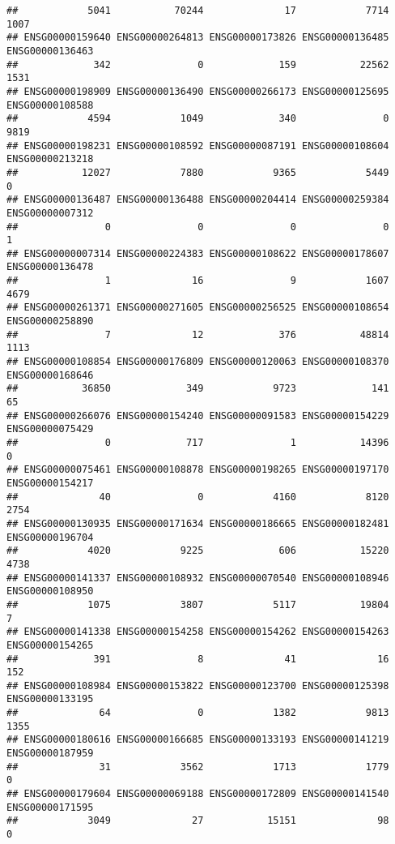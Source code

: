 \documentclass[
]{article}
\begin{document}
\begin{verbatim}
##            5041           70244              17            7714            1007 
## ENSG00000159640 ENSG00000264813 ENSG00000173826 ENSG00000136485 ENSG00000136463 
##             342               0             159           22562            1531 
## ENSG00000198909 ENSG00000136490 ENSG00000266173 ENSG00000125695 ENSG00000108588 
##            4594            1049             340               0            9819 
## ENSG00000198231 ENSG00000108592 ENSG00000087191 ENSG00000108604 ENSG00000213218 
##           12027            7880            9365            5449               0 
## ENSG00000136487 ENSG00000136488 ENSG00000204414 ENSG00000259384 ENSG00000007312 
##               0               0               0               0               1 
## ENSG00000007314 ENSG00000224383 ENSG00000108622 ENSG00000178607 ENSG00000136478 
##               1              16               9            1607            4679 
## ENSG00000261371 ENSG00000271605 ENSG00000256525 ENSG00000108654 ENSG00000258890 
##               7              12             376           48814            1113 
## ENSG00000108854 ENSG00000176809 ENSG00000120063 ENSG00000108370 ENSG00000168646 
##           36850             349            9723             141              65 
## ENSG00000266076 ENSG00000154240 ENSG00000091583 ENSG00000154229 ENSG00000075429 
##               0             717               1           14396               0 
## ENSG00000075461 ENSG00000108878 ENSG00000198265 ENSG00000197170 ENSG00000154217 
##              40               0            4160            8120            2754 
## ENSG00000130935 ENSG00000171634 ENSG00000186665 ENSG00000182481 ENSG00000196704 
##            4020            9225             606           15220            4738 
## ENSG00000141337 ENSG00000108932 ENSG00000070540 ENSG00000108946 ENSG00000108950 
##            1075            3807            5117           19804               7 
## ENSG00000141338 ENSG00000154258 ENSG00000154262 ENSG00000154263 ENSG00000154265 
##             391               8              41              16             152 
## ENSG00000108984 ENSG00000153822 ENSG00000123700 ENSG00000125398 ENSG00000133195 
##              64               0            1382            9813            1355 
## ENSG00000180616 ENSG00000166685 ENSG00000133193 ENSG00000141219 ENSG00000187959 
##              31            3562            1713            1779               0 
## ENSG00000179604 ENSG00000069188 ENSG00000172809 ENSG00000141540 ENSG00000171595 
##            3049              27           15151              98               0 

\end{verbatim}
\end{document}
